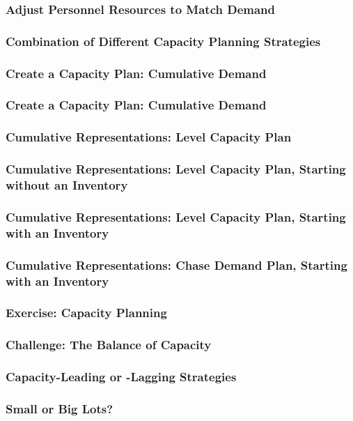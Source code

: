 \subsubsection{Adjust Personnel Resources to Match Demand}
\subsubsection{Combination of Different Capacity Planning Strategies}
\subsubsection{Create a Capacity Plan: Cumulative Demand}
\subsubsection{Create a Capacity Plan: Cumulative Demand}
\subsubsection{Cumulative Representations: Level Capacity Plan}
\subsubsection{Cumulative Representations: Level Capacity Plan, Starting without an Inventory}
\subsubsection{Cumulative Representations: Level Capacity Plan, Starting with an Inventory}
\subsubsection{Cumulative Representations: Chase Demand Plan, Starting with an Inventory}
\subsubsection{Exercise: Capacity Planning}
\subsubsection{Challenge: The Balance of Capacity}
\subsubsection{Capacity-Leading or -Lagging Strategies}
\subsubsection{Small or Big Lots?}
